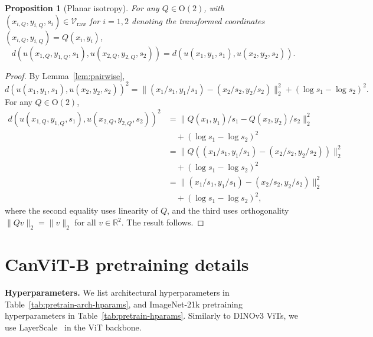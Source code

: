 \documentclass{article}
\newtheorem{proposition}[lemma]{Proposition}
\begin{document}
\begin{proposition}[Planar isotropy]\label{prop:isotropy}
For any $Q \in \mathrm{O}(2)$, with $(x_{i,Q}, y_{i,Q}, s_i) \in \mathcal{V}_{\mathrm{raw}}$ for $i=1,2$ denoting the transformed coordinates $(x_{i,Q}, y_{i,Q}) = Q(x_i, y_i)$,
\[
d(u(x_{1,Q}, y_{1,Q}, s_1), u(x_{2,Q}, y_{2,Q}, s_2)) = d(u(x_1, y_1, s_1), u(x_2, y_2, s_2)).
\]
\end{proposition}
\begin{proof}
By Lemma~\ref{lem:pairwise},
\[
d(u(x_1,y_1,s_1), u(x_2,y_2,s_2))^2 = \| (x_1/s_1, y_1/s_1) - (x_2/s_2, y_2/s_2) \|_2^2 + (\log s_1 - \log s_2)^2.
\]
For any $Q \in \mathrm{O}(2)$,
\begin{align*}
d(u(x_{1,Q}, y_{1,Q}, s_1), u(x_{2,Q}, y_{2,Q}, s_2))^2
&= \| Q(x_1,y_1)/s_1 - Q(x_2,y_2)/s_2 \|_2^2 \\
&\quad + (\log s_1 - \log s_2)^2 \\
&= \| Q((x_1/s_1, y_1/s_1) - (x_2/s_2, y_2/s_2)) \|_2^2 \\
&\quad + (\log s_1 - \log s_2)^2 \\
&= \| (x_1/s_1, y_1/s_1) - (x_2/s_2, y_2/s_2) \|_2^2 \\
&\quad + (\log s_1 - \log s_2)^2,
\end{align*}
where the second equality uses linearity of $Q$, and the third uses orthogonality $\|Qv\|_2 = \|v\|_2$ for all $v \in \mathbb{R}^2$. The result follows.
\end{proof}

\section{CanViT-B pretraining details}
\label{supp:pretraining-details}

\textbf{Hyperparameters.}
We list architectural hyperparameters in Table~\ref{tab:pretrain-arch-hparams},
and ImageNet-21k pretraining hyperparameters in Table~\ref{tab:pretrain-hparams}.
Similarly to DINOv3 ViTs, we use LayerScale~\cite{touvronGoingDeeperImage2021} in the ViT backbone.
\end{document}
